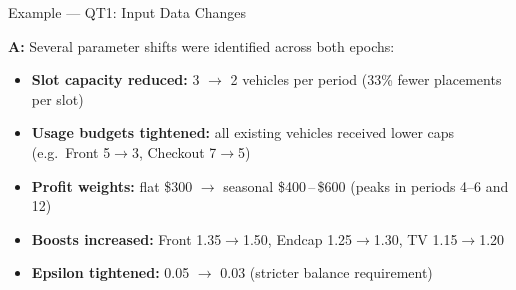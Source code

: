 \documentclass[aspectratio=169,10pt]{beamer}
\begin{document}
\begin{frame}[t]{Example — QT1: Input Data Changes}
\vspace{2pt}
\vspace{4pt}
\small\textbf{\textcolor{lgrn}{A:}}\;
Several parameter shifts were identified across both epochs:
\vspace{2pt}
\footnotesize
\begin{itemize}\setlength\itemsep{3pt}
  \item \textbf{Slot capacity reduced:} 3 $\to$ 2 vehicles per period
        \textcolor{mgray}{(33\% fewer placements per slot)}
  \item \textbf{Usage budgets tightened:} all existing vehicles received lower caps
        \textcolor{mgray}{(e.g.\ Front 5$\to$3, Checkout 7$\to$5)}
  \item \textbf{Profit weights:} flat \$300 $\to$ seasonal \$400\,--\,\$600
        \textcolor{mgray}{(peaks in periods 4--6 and 12)}
  \item \textbf{Boosts increased:} Front 1.35$\to$1.50,\; Endcap 1.25$\to$1.30,\;
        TV 1.15$\to$1.20
  \item \textbf{Epsilon tightened:} 0.05 $\to$ 0.03
        \textcolor{mgray}{(stricter balance requirement)}
\end{itemize}
\vspace{4pt}
\end{frame}
\end{document}
